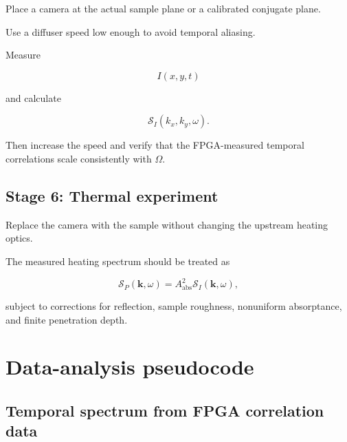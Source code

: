 \documentclass[11pt]{article}
\newcommand{\SII}{\mathcal{S}_{I}}
\newcommand{\kvec}{\mathbf{k}}
\begin{document}
Place a camera at the actual sample plane or a calibrated conjugate plane.

Use a diffuser speed low enough to avoid temporal aliasing.

Measure

\begin{equation}
    I(x,y,t)
\end{equation}

and calculate

\begin{equation}
    \SII(k_x,k_y,\omega).
\end{equation}

Then increase the speed and verify that the FPGA-measured temporal
correlations scale consistently with $\Omega$.

\subsection{Stage 6: Thermal experiment}

Replace the camera with the sample without changing the upstream heating
optics.

The measured heating spectrum should be treated as

\begin{equation}
    \mathcal{S}_P(\kvec,\omega)
    =
    A_{\mathrm{abs}}^2
    \SII(\kvec,\omega),
\end{equation}

subject to corrections for reflection, sample roughness, nonuniform
absorptance, and finite penetration depth.

\section{Data-analysis pseudocode}

\subsection{Temporal spectrum from FPGA correlation data}
\end{document}
